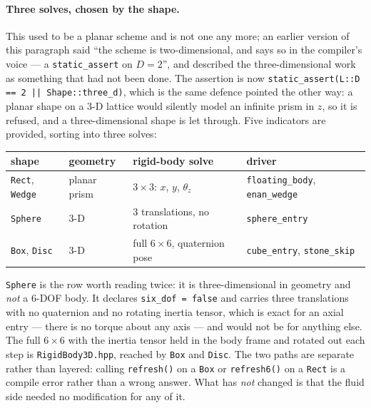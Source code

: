 \documentclass[11pt,a4paper]{article}
\newcommand{\code}[1]{\texttt{\small #1}}
\begin{document}
\paragraph{Three solves, chosen by the shape.} This used to be a planar scheme and
is not one any more; an earlier version of this paragraph said ``the scheme is
two-dimensional, and says so in the compiler's voice --- a \code{static\_assert}
on $D=2$'', and described the three-dimensional work as something that had not
been done. The assertion is now
\code{static\_assert(L::D == 2 || Shape::three\_d)}, which is the same defence
pointed the other way: a planar shape on a 3-D lattice would silently model an
infinite prism in $z$, so it is refused, and a three-dimensional shape is let
through. Five indicators are provided, sorting into three solves:
\begin{center}\small
\begin{tabular}{llll}
\toprule
shape & geometry & rigid-body solve & driver \\
\midrule
\code{Rect}, \code{Wedge} & planar prism & $3\times3$: $x$, $y$, $\theta_z$ & \code{floating\_body}, \code{enan\_wedge} \\
\code{Sphere}             & 3-D          & $3$ translations, no rotation    & \code{sphere\_entry} \\
\code{Box}, \code{Disc}   & 3-D          & full $6\times6$, quaternion pose & \code{cube\_entry}, \code{stone\_skip} \\
\bottomrule
\end{tabular}
\end{center}
\code{Sphere} is the row worth reading twice: it is three-dimensional in geometry
and \emph{not} a 6-DOF body. It declares \code{six\_dof = false} and carries three
translations with no quaternion and no rotating inertia tensor, which is exact for
an axial entry --- there is no torque about any axis --- and would not be for
anything else. The full $6\times6$ with the inertia tensor held in the body frame
and rotated out each step is \code{RigidBody3D.hpp}, reached by \code{Box} and
\code{Disc}. The two paths are separate rather than layered: calling
\code{refresh()} on a \code{Box} or \code{refresh6()} on a \code{Rect} is a
compile error rather than a wrong answer. What has \emph{not} changed is that the
fluid side needed no modification for any of it.
\end{document}
